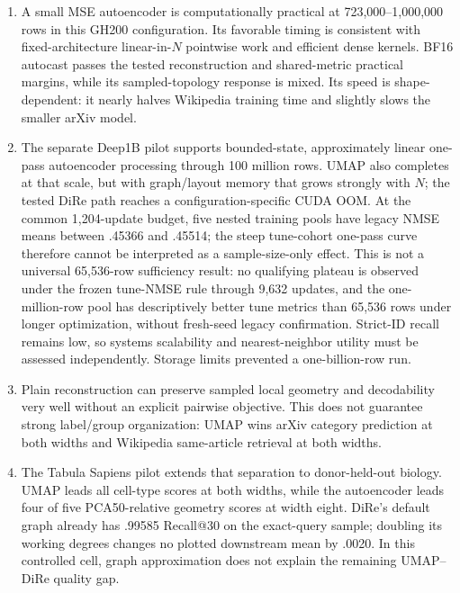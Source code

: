 \documentclass[10pt]{article}
\begin{document}
\begin{enumerate}
  \item A small MSE autoencoder is computationally practical at 723,000--1,000,000 rows
        in this GH200 configuration.  Its favorable timing is consistent with
        fixed-architecture linear-in-$N$ pointwise work and efficient dense kernels.
        BF16 autocast passes the tested reconstruction and shared-metric practical
        margins, while its sampled-topology response is mixed.  Its speed is
        shape-dependent: it nearly halves Wikipedia training time and slightly slows the
        smaller arXiv model.
  \item The separate Deep1B pilot supports bounded-state, approximately linear one-pass
        autoencoder processing through 100 million rows.  UMAP also completes at that
        scale, but with graph/layout memory that grows strongly with $N$; the tested
        DiRe path reaches a configuration-specific CUDA OOM.  At the common 1,204-update
        budget, five nested training pools have legacy NMSE means between .45366 and
        .45514; the steep tune-cohort one-pass curve therefore cannot be interpreted as a
        sample-size-only effect.  This is not a universal 65,536-row sufficiency result:
        no qualifying plateau is observed under the frozen tune-NMSE rule through 9,632
        updates, and
        the one-million-row pool has descriptively better tune metrics than 65,536 rows
        under longer optimization, without fresh-seed legacy confirmation.  Strict-ID
        recall
        remains low, so systems scalability and nearest-neighbor utility must be assessed
        independently.  Storage limits prevented a one-billion-row run.
  \item Plain reconstruction can preserve sampled local geometry and decodability very
        well without an explicit pairwise objective.  This does not guarantee strong
        label/group organization: UMAP wins arXiv category prediction at both widths and
        Wikipedia same-article retrieval at both widths.
  \item The Tabula Sapiens pilot extends that separation to donor-held-out biology.
        UMAP leads all cell-type scores at both widths, while the autoencoder leads four
        of five PCA50-relative geometry scores at width eight.  DiRe's default graph
        already has .99585 Recall@30 on the exact-query sample; doubling its working
        degrees changes no plotted downstream mean by .0020.  In this controlled cell,
        graph approximation does not explain the remaining UMAP--DiRe quality gap.

\end{enumerate}
\end{document}
